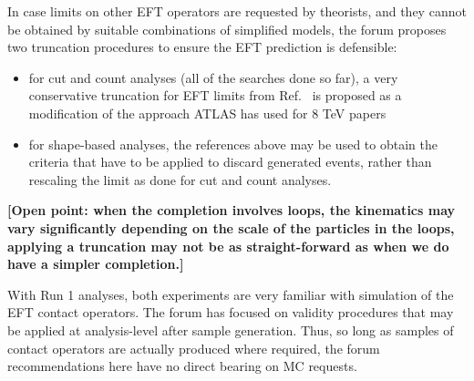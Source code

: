 \documentclass[a4,debug,notitlepage,nobib]{tufte-handout}
\begin{document}
In case limits on other EFT operators are requested by theorists, and they
cannot be obtained by suitable combinations of simplified models, the
forum proposes two truncation procedures to ensure the EFT prediction
is defensible:

\begin{itemize}
\item for cut and count analyses (all of the searches done so far), a very conservative truncation for EFT 
limits from Ref.~\cite{Racco:2015dxa} is proposed as a modification of the approach 
ATLAS has used for 8 TeV papers~\cite{Aad:2015zva}
\item for shape-based analyses, the references above may be used to obtain the criteria that 
have to be applied to discard generated events, rather than rescaling the limit as done
for cut and count analyses. 
\end{itemize}

\textbf{[Open point: when the completion involves loops, 
the kinematics may vary significantly depending on the scale of the particles in 
the loops, applying a truncation may not be as straight-forward as when we do have a simpler completion.]}

With Run 1 analyses, both experiments are very familiar with
simulation of the EFT contact operators. The forum has focused on
validity procedures that may be applied at analysis-level after sample
generation. Thus, so long as samples of contact operators are actually
produced where required, the forum recommendations here have no direct
bearing on MC requests.





\end{document}
